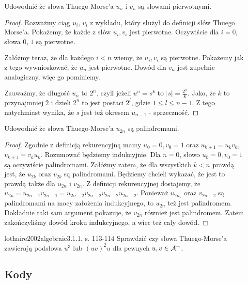\begin{problem}{}{}
  Udowodnić że słowa Thuego-Morse'a $u_n$ i $v_n$ są słowami pierwotnymi.
\end{problem}

\begin{proof}
Rozważmy ciąg $u_i$, $v_i$ z wykładu, który służył do definicji słów Thuego Morse'a. Pokażemy, że każde z słów $u_i, v_i$ jest pierwotne.
Oczywiście dla $i=0$, słowa $0$, $1$ są pierwotne.

Załóżmy teraz, że dla każdego $i < n$ wiemy, że $u_i, v_i$ są pierwotne. Pokażemy jak z tego wywnioskować, że $u_n$ jest pierwotne. Dowód dla $v_n$ jest zupełnie analogiczny, więc go pominiemy.

Zauważmy, że długość $u_n$ to $2^n$, czyli jeżeli $u^n = s^k$ to $|s| = \frac{2^n}{k}$. Jako, że $k$ to przynajmniej $2$ i dzieli $2^n$ to jest postaci $2^l$, gdzie $1 \leq l \leq n-1$. Z tego natychmiast wynika, że $s$ jest też okresem $u_{n-1}$ - sprzeczność.
\end{proof}

\begin{problem}{}{}
  Udowodnić że słowa Thuego-Morse'a $u_{2n}$ są palindromami.
\end{problem}

\begin{proof}
Zgodnie z definicją rekurencyjną mamy $u_0=0,v_0=1$ oraz $u_{k+1}=u_kv_k$, $v_{k+1}=v_ku_k$. Rozumować będziemy indukcyjnie. Dla $n=0$, słowo $u_0=0, v_0=1$ są oczywiście palindromami. Załóżmy zatem, że dla wszystkich $k < n$ prawdą jest, że $u_{2k}$ oraz $v_{2k}$ są palindromami. Będziemy chcieli wykazać, że jest to prawdą także dla $u_{2n}$ i $v_{2n}$. Z definicji rekurencyjnej dostajemy, że $u_{2n}=u_{2n-1}v_{2n-1}=u_{2n-2}v_{2n-2}v_{2n-2}u_{2n-2}$. Ponieważ $u_{2n_2}$ oraz $v_{2n-2}$ są palindromami na mocy założenia indukcyjnego, to $u_{2n}$ też jest palindromem. Dokładnie taki sam argument pokazuje, że $v_{2n}$ również jest palindromem. Zatem zakończyliśmy dowód kroku indukcyjnego, a więc też cały dowód.
\end{proof}

\begin{problem}{lothaire2002algebraic}{3.1.1, s. 113-114}
  Sprawdzić czy słowa Thuego-Morse'a zawierają podsłowa $u^3$ lub $(uv)^2u$ dla pewnych $u, v \in \operatorname{\mathcal{A}}^+$.
\end{problem}

\subsection{Kody}

